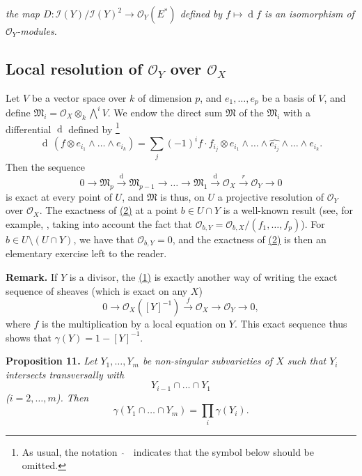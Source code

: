 \documentclass{article}
\newenvironment{itenv}[1]
  {\phantomsection\par\medskip\noindent\textbf{#1.}\itshape}
  {\medskip}
\newenvironment{rmenv}[1]
  {\phantomsection\par\medskip\noindent\textbf{#1.}\rmfamily}
  {\medskip}
\newcommand{\scr}[1]{{\mathscr{#1}}}
\newcommand{\dd}{\operatorname{d}\!}
\newcommand{\oldpage}[1]{\marginpar{\footnotesize$\Big\vert$ \textit{p.~#1}}}
\begin{document}
\medskip

\emph{the map $D\colon\scr{I}(Y)/\scr{I}(Y)^2 \to \scr{O}_Y(E^*)$ defined by $f\mapsto\dd f$ is an isomorphism of $\scr{O}_Y$-modules.}


\subsection{Local resolution of \texorpdfstring{$\scr{O}_Y$}{OY} over \texorpdfstring{$\scr{O}_X$}{OX}}
\label{subsection10c}

Let $V$ be a vector space over $k$ of dimension $p$, and $e_1,\ldots,e_p$ be a basis of $V$, and define $\mathfrak{M}_i = \scr{O}_X\otimes_k\bigwedge\nolimits^i V$.
We endow the direct sum $\mathfrak{M}$ of the $\mathfrak{M}_i$ with a differential $\dd$ defined by
\footnote{As usual, the notation $\,\,\widehat{\,}\,\,\,$ indicates that the symbol below should be omitted.}
\[
  \dd\,(f\otimes e_{i_1}\wedge\ldots\wedge e_{i_k})
  = \sum_j (-1)^i f\cdot f_{i_j}\otimes e_{i_1}\wedge\ldots\wedge \widehat{e_{i_j}} \wedge\ldots\wedge e_{i_k}.
\]
Then the sequence
\[
\label{section10cequation2}
  0 \to \mathfrak{M}_p \xrightarrow{\mathrm{d}} \mathfrak{M}_{p-1} \to \ldots \to \mathfrak{M}_1 \xrightarrow{\mathrm{d}} \scr{O}_X \xrightarrow{r} \scr{O}_Y \to 0
  \tag{2}
\]
is exact at every point of $U$, and $\mathfrak{M}$ is thus, on $U$ a
\oldpage{121}
projective resolution of $\scr{O}_Y$ over $\scr{O}_X$.
The exactness of \hyperref[section10cequation2]{(2)} at a point $b\in U\cap Y$ is a well-known result (see, for example, \cite[proposition~4.3, p.~151]{3}, taking into account the fact that $\scr{O}_{b,Y}=\scr{O}_{b,X}/(f_1,\ldots,f_p)$).
For $b\in U\setminus(U\cap Y)$, we have that $\scr{O}_{b,Y}=0$, and the exactness of \hyperref[section10cequation2]{(2)} is then an elementary exercise left to the reader.

\begin{rmenv}{Remark}
  If $Y$ is a divisor, the \hyperref[section10aequation1]{(1)} is exactly another way of writing the exact sequence of sheaves (which is exact on any $X$)
  \[
  \label{equation3}
    0 \to \scr{O}_X([Y]^{-1}) \xrightarrow{f} \scr{O}_X \to \scr{O}_Y \to 0,
    \tag{3}
  \]
  where $f$ is the multiplication by a local equation on $Y$.
  This exact sequence thus shows that $\gamma(Y)=1-[Y]^{-1}$.
\end{rmenv}

\begin{itenv}{Proposition 11}
\label{proposition11}
  Let $Y_1,\ldots,Y_m$ be non-singular subvarieties of $X$ such that $Y_i$ intersects transversally with
  \[
    Y_{i-1} \cap\ldots\cap Y_1
  \]
  ($i=2,\ldots,m$).
  Then
  \[
    \gamma(Y_1\cap\ldots\cap Y_m) = \prod_i\gamma(Y_i).
  \]
\end{itenv}
\end{document}
